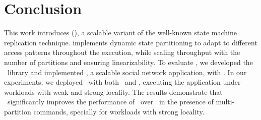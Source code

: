 \section{Conclusion}
\label{sec:conclusion}

This work introduces \dssmrlong{} (\dssmr), a scalable variant of the well-known state machine replication technique. 
\dssmr{} implements dynamic state partitioning to adapt to different access patterns throughout the execution, while scaling throughput with the number of partitions and ensuring linearizability.
To evaluate \dssmr{}, we developed the \libname\ library and implemented \appname{}, a scalable social network application, with \libname{}.
In our experiments, we deployed \appname\ with both \dssmr\ and \ssmr{}, executing the application under workloads with weak and strong locality.
The results demonstrate that \dssmr\ significantly improves the performance of \appname\ over \ssmr\ in the presence of multi-partition commands, specially for workloads with strong locality.


